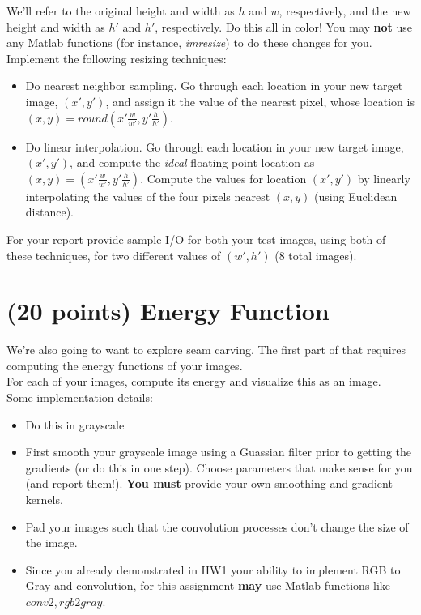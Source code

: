 \documentclass{article}
\begin{document}
\noindent
We'll refer to the original height and width as $h$ and $w$, respectively, and the new height and width as $h\prime$ and $h\prime$, respectively.  Do this all in color!  You may \textbf{not} use any Matlab functions (for instance, \emph{imresize}) to do these changes for you.\\   

\noindent
Implement the following resizing techniques:
\begin{itemize}
\item Do nearest neighbor sampling.   Go through each location in your new target image, $(x\prime, y\prime)$, and assign it the value of the nearest pixel, whose location is $(x, y) = round(x\prime \frac{w}{w\prime}, y\prime \frac{h}{h\prime})$.
\item Do linear interpolation.   Go through each location in your new target image, $(x\prime, y\prime)$, and compute the \emph{ideal} floating point location as $(x, y) =(x\prime \frac{w}{w\prime}, y\prime \frac{h}{h\prime})$.  Compute the values for location $(x\prime, y\prime)$ by linearly interpolating the values of the four pixels nearest $(x,y)$ (using Euclidean distance).
\end{itemize}

\noindent
For your report provide sample I/O for both your test images, using both of these techniques, for two different values of $(w\prime, h\prime)$ (8 total images).
\newpage

\section{(20 points) Energy Function}
We're also going to want to explore seam carving.  The first part of that requires computing the energy functions of your images.\\

\noindent
For each of your images, compute its energy and visualize this as an image.\\

\noindent
Some implementation details:
\begin{itemize}
\item Do this in grayscale
\item First smooth your grayscale image using a Guassian filter prior to getting the gradients (or do this in one step).  Choose parameters that make sense for you (and report them!).  \textbf{You must} provide your own smoothing and gradient kernels.
\item Pad your images such that the convolution processes don’t change the size of the image.
\item Since you already demonstrated in HW1 your ability to implement RGB to Gray and convolution, for this assignment \textbf{may} use Matlab functions like $conv2, rgb2gray$.
\end{itemize}
\end{document}
